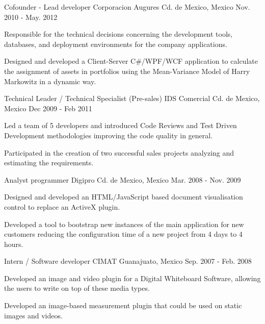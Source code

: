 \begin{cventries}
  \cventry
    {Cofounder - Lead developer} %
    {Corporacion Augures} %
    {Cd. de Mexico, Mexico} %
    {Nov. 2010 - May. 2012} %
    {}
    {
      \begin{cvitems} %
        \item {Responsible for the technical decisions concerning the development tools, databases, and deployment environments for the company applications.}
        \item {Designed and developed a Client-Server C\#/WPF/WCF application to calculate the assignment of assets in portfolios using the Mean-Variance Model of Harry Markowitz in a dynamic way.}
      \end{cvitems}
    }

  \cventry
    {Technical Leader / Technical Specialist (Pre-sales)} %
    {IDS Comercial} %
    {Cd. de Mexico, Mexico} %
    {Dec 2009 - Feb 2011} %
    {}
    {
      \begin{cvitems} %
        \item {Led a team of 5 developers and introduced Code Reviews and Test Driven Development methodologies improving the code quality in
        general.}
        \item {Participated in the creation of two successful sales projects analyzing and estimating the requirements.}
      \end{cvitems}
    }
  \cventry
    {Analyst programmer} %
    {Digipro} %
    {Cd. de Mexico, Mexico} %
    {Mar. 2008 - Nov. 2009} %
    {}
    {
      \begin{cvitems} %
        \item {Designed and developed an HTML/JavaScript based document visualisation control to replace an ActiveX plugin.}
        \item {Developed a tool to bootstrap new instances of the main application for new customers reducing the configuration time of a new project
        from 4 days to 4 hours.}
      \end{cvitems}
    }

  \cventry
    {Intern / Software developer} %
    {CIMAT} %
    {Guanajuato, Mexico} %
    {Sep. 2007 - Feb. 2008} %
    {}
    {
      \begin{cvitems} %
        \item {Developed an image and video plugin for a Digital Whiteboard Software, allowing the users to write on top of these media types.}
        \item {Developed an image-based measurement plugin that could be used on static images and videos.}
      \end{cvitems}
    }

\end{cventries}
